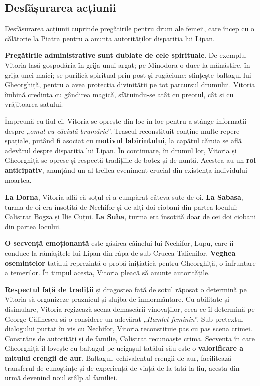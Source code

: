 \documentclass{article}
\newcommand{\qu}[1]{„\emph{#1}”}
\begin{document}
\subsection{Desfășurarea acțiunii}
Desfășurarea acțiunii cuprinde pregătirile pentru drum ale femeii, care încep cu o călătorie la Piatra pentru a anunța autorităților dispariția lui Lipan.

\textbf{Pregătirile administrative sunt dublate de cele spirituale}. De exemplu, Vitoria lasă gospodăria în grija unui argat; pe Minodora o duce la mănăstire, în grija unei maici; se purifică spiritual prin post și rugăciune; sfințește baltagul lui Gheorghiță, pentru a avea protecția divinității pe tot parcursul drumului. Vitoria îmbină credința cu gândirea magică, sfătuindu-se atât cu preotul, cât și cu vrăjitoarea satului.

Împreună cu fiul ei, Vitoria se oprește din loc în loc pentru a stânge informații despre \qu{omul cu căciulă brumărie}. Traseul reconstituit conține multe repere spațiale, putând fi asociat cu \textbf{motivul labirintului}, la capătul căruia se află adevărul despre dispariția lui Lipan. În continuare, în drumul lor, Vitoria și Gheorghiță se opresc și respectă tradițiile de botez și de nuntă. Acestea au un \textbf{rol anticipativ}, anunțând un al treilea eveniment crucial din existența individului -- moartea.

\textbf{La Dorna}, Vitoria află că soțul ei a cumpărat câteva sute de oi. \textbf{La Sabasa}, turma de oi era însoțită de Nechifor și de alți doi ciobani din partea locului: Calistrat Bogza și Ilie Cuțui. \textbf{La Suha}, turma era însoțită doar de cei doi ciobani din partea locului.

\textbf{O secvență emoționantă} este găsirea câinelui lui Nechifor, Lupu, care îi conduce la rămășițele lui Lipan din râpa de sub Crucea Talienilor. \textbf{Veghea osemintelor} tatălui reprezintă o probă inițiatică pentru Gheorghiță, o înfruntare a temerilor. În timpul acesta, Vitoria pleacă să anunțe autoritățile.

\textbf{Respectul față de tradiții} și dragostea față de soțul răposat o determină pe Vitoria să organizeze praznicul și slujba de înmormântare. Cu abilitate și disimulare, Vitoria regizează scena demascării vinovaților, ceea ce îl determină pe George Călinescu să o considere un adevărat \qu{Hamlet feminin}. Sub pretextul dialogului purtat în vis cu Nechifor, Vitoria reconstituie pas cu pas scena crimei. Constrâns de autorități și de familie, Calistrat recunoaște crima. Secvența în care Gheorghiță îl lovește cu baltagul pe ucigașul tatălui său este o \textbf{valorificare a mitului crengii de aur}. Baltagul, echivalentul crengii de aur, facilitează transferul de cunoștințe și de experiență de viață de la tată la fiu, acesta din urmă devenind noul stâlp al familiei.
\end{document}
